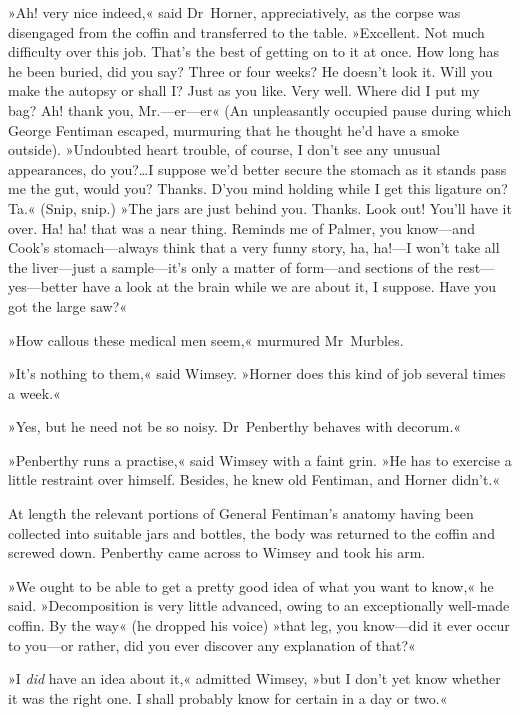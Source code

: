 »Ah! very nice indeed,« said Dr~Horner, appreciatively, as the corpse was disengaged from the coffin and transferred to the table. »Excellent. Not much difficulty over this job. That's the best of getting on to it at once. How long has he been buried, did you say? Three or four weeks? He doesn't look it. Will you make the autopsy or shall I\@? Just as you like. Very well. Where did I put my bag? Ah! thank you, Mr.—er—er\longdash« (An unpleasantly occupied pause during which George Fentiman escaped, murmuring that he thought he'd have a smoke outside). »Undoubted heart trouble, of course, I don't see any unusual appearances, do you?\dots I suppose we'd better secure the stomach as it stands \textellipsis  pass me the gut, would you? Thanks. D'you mind holding while I get this ligature on? Ta.« (Snip, snip.) »The jars are just behind you. Thanks. Look out! You'll have it over. Ha! ha! that was a near thing. Reminds me of Palmer, you know—and Cook's stomach—always think that a very funny story, ha, ha!—I won't take all the liver—just a sample—it's only a matter of form—and sections of the rest—yes—better have a look at the brain while we are about it, I suppose. Have you got the large saw?«

»How callous these medical men seem,« murmured Mr~Murbles.

»It's nothing to them,« said Wimsey. »Horner does this kind of job several times a week.«

»Yes, but he need not be so noisy. Dr~Penberthy behaves with decorum.«

»Penberthy runs a practise,« said Wimsey with a faint grin. »He has to exercise a little restraint over himself. Besides, he knew old Fentiman, and Horner didn't.«

At length the relevant portions of General Fentiman's anatomy having been collected into suitable jars and bottles, the body was returned to the coffin and screwed down. Penberthy came across to Wimsey and took his arm.

»We ought to be able to get a pretty good idea of what you want to know,« he said. »Decomposition is very little advanced, owing to an exceptionally well-made coffin. By the way« (he dropped his voice) »that leg, you know—did it ever occur to you—or rather, did you ever discover any explanation of that?«

»I \textit{did} have an idea about it,« admitted Wimsey, »but I don't yet know whether it was the right one. I shall probably know for certain in a day or two.«

